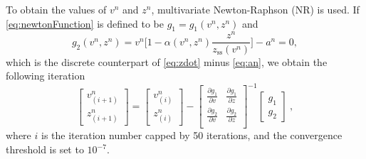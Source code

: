 \documentclass[twoside,a4paper,dvipsnames]{article}
\begin{document}
To obtain the values of $v^n$ and $z^n$, multivariate Newton-Raphson (NR) is used. If \eqref{eq:newtonFunction} is defined to be $g_1  = g_1(v^n, z^n)$ and 
\begin{equation}
   g_2(v^n, z^n) = v^n\bigg[1-\alpha(v^n,z^n)\frac{z^n}{z_\text{ss}(v^n)}\bigg] - a^n = 0,
\end{equation}
which is the discrete counterpart of \eqref{eq:zdot} minus \eqref{eq:an}, we obtain the following iteration 
\begin{equation}
    \begin{bmatrix}
    v_{(i+1)}^n\\
    z_{(i+1)}^n
    \end{bmatrix}
    =
    \begin{bmatrix}
    v_{(i)}^n\\
    z_{(i)}^n
    \end{bmatrix}
    -
    \begin{bmatrix}
    \frac{\partial g_1}{\partial v} & \frac{\partial g_1}{\partial z}\\
    \frac{\partial g_2}{\partial v} & \frac{\partial g_2}{\partial z}\\
    \end{bmatrix}^{-1}
    \begin{bmatrix}
    g_1\\
    g_2
    \end{bmatrix}\ ,
\end{equation}
where $i$ is the iteration number capped by 50 iterations, and the convergence threshold is set to $10^{-7}$. 
\end{document}
